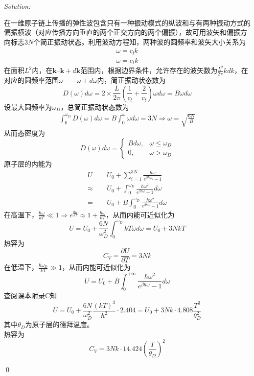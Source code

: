 \documentclass[12pt,a4paper]{article}
\newenvironment{sol}
    {\emph{Solution:}
    }
    {
    \qed
    }
\begin{document}
\begin{sol}
在一维原子链上传播的弹性波包含只有一种振动模式的纵波和与有两种振动方式的偏振横波（对应传播方向垂直的两个正交方向的两个偏振），故可用波矢和偏振方向标志$3N$个简正振动状态。利用波动方程知，两种波的圆频率和波矢大小关系为
\begin{gather}
\omega=c_lk\\
\omega=c_tk
\end{gather}
在面积$L^2$内，在$\bm{k}$--$\bm{k}+d\bm{k}$范围内，根据边界条件，允许存在的波矢数为$\frac{L^2}{2\pi}kdk$，在对应的圆频率范围$\omega--\omega+d\omega$内，简正振动状态数为
\begin{equation}
D(\omega)d\omega=2\times\frac{L}{2\pi}\left(\frac{1}{c_l}+\frac{2}{c_t}\right)\omega d\omega=B\omega d\omega
\end{equation}
设最大圆频率为$\omega_D$，总简正振动状态数为
\begin{gather}
\int_0^{\omega_D}D(\omega)d\omega=B\int_0^{\omega}\omega d\omega=3N
\Longrightarrow\omega=\sqrt{\frac{6N}{B}}
\end{gather}
从而态密度为
\begin{equation}
D(\omega)d\omega=\left\{\begin{array}{ll}
Bd\omega,&\omega\leq\omega_D\\
0,&\omega>\omega_D
\end{array}\right.
\end{equation}
原子层的内能为
\begin{align}
\nonumber U=&U_0+\sum_{i=1}^{3N}\frac{\hbar\omega}{e^{\beta\hbar\omega_i}-1}\\
\nonumber\approx&U_0+\int_0^{\omega_D}\frac{\hbar\omega^2}{e^{\beta\hbar\omega}-1}d\omega\\
=&U_0+B\int_0^{\omega_D}\frac{\hbar\omega^2}{e^{\beta\hbar\omega}-1}d\omega
\end{align}
在高温下，$\frac{\hbar\omega}{kT}\ll1\Longrightarrow e^{\frac{\hbar\omega}{kT}}\approx1+\frac{\hbar\omega}{kT}$，从而内能可近似化为
\begin{equation}
U=U_0+\frac{6N}{\omega_D^2}\int_0^{\omega_D}kT\omega d\omega=U_0+3NkT
\end{equation}
热容为
\begin{equation}
C_V=\frac{\partial U}{\partial T}=3Nk
\end{equation}
在低温下，$\frac{\hbar\omega_D}{kT}\gg1$，从而内能可近似化为
\begin{equation}
U=U_0+B\int_0^{+\infty}\frac{\hbar\omega^2}{e^{\beta\hbar\omega}-1}d\omega
\end{equation}
查阅课本附录C知
\begin{equation}
U=U_0+\frac{6N}{\omega_D^2}\frac{(kT)^3}{\hbar^2}\cdot2.404=U_0+3Nk\cdot4.808\frac{T^3}{\theta_D^2}
\end{equation}
其中$\theta_D$为原子层的德拜温度。\\
热容为
\begin{equation}
C_V=3Nk\cdot14.424\left(\frac{T}{\theta_D}\right)^2
\end{equation}
\end{sol}
\end{document}
